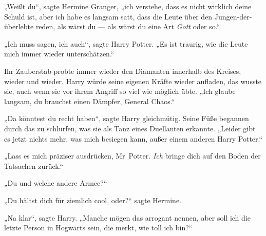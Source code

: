„Weißt du“, sagte Hermine Granger, „ich verstehe, dass es nicht wirklich deine Schuld ist, aber ich habe es langsam satt, dass die Leute über den Jungen-der-überlebte reden, als wärst du — als wärst du eine Art \emph{Gott} oder so.“

„Ich muss sagen, ich auch“, sagte Harry Potter.
„Es ist traurig, wie die Leute mich immer wieder unterschätzen.“

Ihr Zauberstab probte immer wieder den Diamanten innerhalb des Kreises, wieder und wieder. Harry würde seine eigenen Kräfte wieder aufladen, das wusste sie, auch wenn sie vor ihrem Angriff so viel wie möglich übte.
„Ich glaube langsam, du brauchst einen Dämpfer, General Chaos.“

„Da könntest du recht haben“, sagte Harry gleichmütig. Seine Füße begannen durch das zu schlurfen, was sie als Tanz eines Duellanten erkannte.
„Leider gibt es jetzt nichts mehr, was mich besiegen kann, außer einem anderen Harry Potter.“

„Lass es mich präziser ausdrücken, Mr~Potter. \emph{Ich} bringe dich auf den Boden der Tatsachen zurück.“

„Du und welche andere Armee?“

„Du hältst dich für ziemlich cool, oder?“ sagte Hermine.

„Na klar“, sagte Harry.
„Manche mögen das arrogant nennen, aber soll ich die letzte Person in Hogwarts sein, die merkt, wie toll ich bin?“

